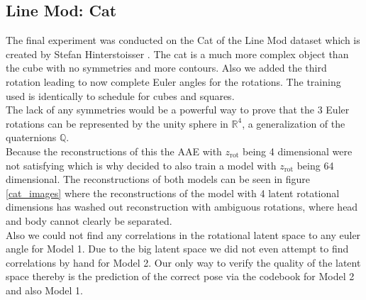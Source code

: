 \documentclass[10pt,a4paper]{article}
\newcommand{\rot}{\ensuremath{\text{rot}\xspace}}
\begin{document}
\subsection{Line Mod: Cat}
The final experiment was conducted on the Cat of the Line Mod dataset which is created by Stefan Hinterstoisser \cite{LINEMOD}.
The cat is a much more complex object than the cube with no symmetries and more contours. Also we added the third rotation leading to now complete Euler angles for the rotations. The training used is identically to schedule for cubes and squares. \\
The lack of any symmetries would be a powerful way to prove that the 3 Euler rotations can be represented by the unity sphere in $\mathbb{R}^4$, a generalization of the quaternions $\mathbb{Q}$.\\
Because the reconstructions of this the AAE with $z_{\rot}$ being 4 dimensional were not satisfying which is why decided to also train a model with $z_{\rot}$ being 64 dimensional. The reconstructions of both models can be seen in figure \ref{cat_images} where the reconstructions of the model with 4 latent rotational dimensions has washed out reconstruction with ambiguous rotations, where head and body cannot clearly be separated. \\
Also we could not find any correlations in the rotational latent space to any euler angle for Model 1. Due to the big latent space we did not even attempt to find correlations by hand for Model 2. Our only way to verify the quality of the latent space thereby is the prediction of the correct pose via the codebook for Model 2 and also Model 1. \\
\end{document}

